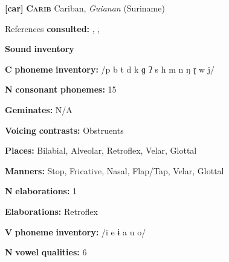 \documentclass[output=paper]{langsci/langscibook}
\begin{document}
\begin{styleBody}
\textbf{[car]}   \textbf{\textsc{Carib}  }  Cariban, \textit{Guianan} (Suriname)
\end{styleBody}

\begin{styleBody}
References \textbf{consulted:} \citet{Courtz2008}, \citet{Hoff1968}, \citet{Peasgood1972}
\end{styleBody}

\begin{styleBody}
\textbf{Sound} \textbf{inventory}
\end{styleBody}

\begin{styleBody}
\textbf{C} \textbf{phoneme} \textbf{inventory:} /p b t d k ɡ ʔ s h m n ŋ ɽ w j/
\end{styleBody}

\begin{styleBody}
\textbf{N} \textbf{consonant} \textbf{phonemes:} 15
\end{styleBody}

\begin{styleBody}
\textbf{Geminates:} N/A
\end{styleBody}

\begin{styleBody}
\textbf{Voicing} \textbf{contrasts:} Obstruents
\end{styleBody}

\begin{styleBody}
\textbf{Places:} Bilabial, Alveolar, Retroflex, Velar, Glottal
\end{styleBody}

\begin{styleBody}
\textbf{Manners:} Stop, Fricative, Nasal, Flap/Tap, Velar, Glottal
\end{styleBody}

\begin{styleBody}
\textbf{N} \textbf{elaborations:} 1
\end{styleBody}

\begin{styleBody}
\textbf{Elaborations:} Retroflex
\end{styleBody}

\begin{styleBody}
\textbf{V} \textbf{phoneme} \textbf{inventory:} /i e ɨ a u o/
\end{styleBody}

\begin{styleBody}
\textbf{N} \textbf{vowel} \textbf{qualities:} 6
\end{styleBody}
\end{document}
